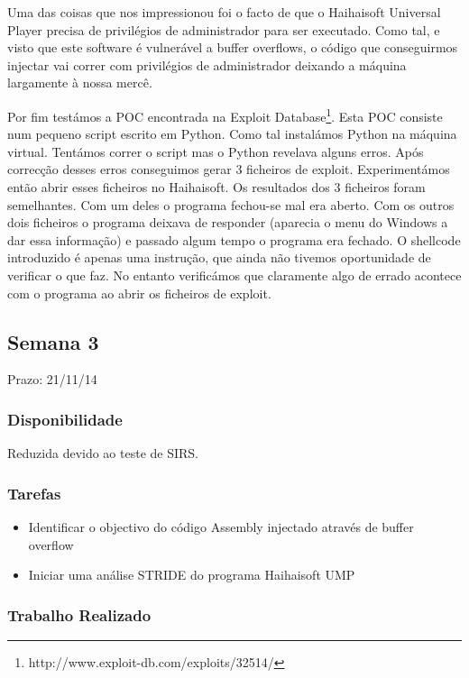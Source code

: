 \documentclass[a4paper]{article}
\begin{document}
Uma das coisas que nos impressionou foi o facto de que o Haihaisoft Universal Player precisa de privilégios de administrador para ser executado. Como tal, e visto que este software é vulnerável a buffer overflows, o código que conseguirmos injectar vai correr com privilégios de administrador deixando a máquina largamente à nossa mercê.

Por fim testámos a POC encontrada na Exploit Database\footnote{http://www.exploit-db.com/exploits/32514/}. Esta POC consiste num pequeno script escrito em Python. Como tal instalámos Python na máquina virtual. Tentámos correr o script mas o Python revelava alguns erros. Após correcção desses erros conseguimos gerar 3 ficheiros de exploit. Experimentámos então abrir esses ficheiros no Haihaisoft. Os resultados dos 3 ficheiros foram semelhantes. Com um deles o programa fechou-se mal era aberto. Com os outros dois ficheiros o programa deixava de responder (aparecia o menu do Windows a dar essa informação) e passado algum tempo o programa era fechado. O shellcode introduzido é apenas uma instrução, que ainda não tivemos oportunidade de verificar o que faz. No entanto verificámos que claramente algo de errado acontece com o programa ao abrir os ficheiros de exploit.

\subsection{Semana 3}
Prazo: 21/11/14
\subsubsection{Disponibilidade}
Reduzida devido ao teste de SIRS.

\subsubsection{Tarefas}
\begin{itemize}
	\item Identificar o objectivo do código Assembly injectado através de buffer overflow
	\item Iniciar uma análise STRIDE do programa Haihaisoft UMP
\end{itemize}

\subsubsection{Trabalho Realizado}
\end{document}

